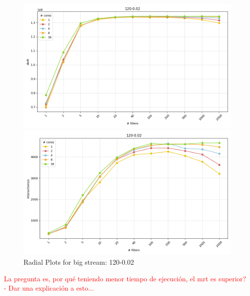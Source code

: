 \documentclass[12pt,a4paper]{article}
\begin{document}
\begin{figure}[H]
    \hspace*{-3cm} %
    \begin{minipage}{0.5\textwidth}
        \centering
        \includegraphics[scale=0.4]{../processed/NRT/small/checks/120-0.02/combined/dieft-1.png}
        \caption*{}
    \end{minipage}
    \hspace{0.16\textwidth}
    \begin{minipage}{0.5\textwidth}
        \centering
        \includegraphics[scale=0.4]{../processed/NRT/small/checks/120-0.02/combined/interactions-1.png}
        \caption*{}
    \end{minipage}

    \caption{Radial Plots for big stream: 120-0.02}
    \label{img:exps-read-input-variants}
\end{figure}

\textcolor{red}{La pregunta es, por qué teniendo menor tiempo de ejecución, el mrt es superior? - Dar una explicación a esto...}
\end{document}
